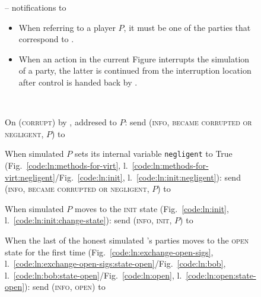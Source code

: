 \begin{figure}[H]
  \begin{simulatorbox}{\simulator{} -- notifications to \fchan}
    \begin{itemize}
      \item When referring to a player $P$, it must be one of the parties that
      correspond to \fchan.
      \item When an action in the current Figure interrupts the simulation of a
      party, the latter is continued from the interruption location after
      control is handed back by \fchan.
    \end{itemize} \ \\
    \begin{algorithmic}[1]
      \State On (\textsc{corrupt}) by \adversary, addresed to $P$:
      \Indent
        \State {}
        \State send (\textsc{info}, \textsc{became corrupted or negligent}, $P$)
        to \fchan
      \EndIndent
      \Statex

      \State When simulated $P$ sets its internal variable \texttt{negligent} to
      True (Fig.~\ref{code:ln:methods-for-virt},
      l.~\ref{code:ln:methods-for-virt:negligent}/Fig.~\ref{code:ln:init},
      l.~\ref{code:ln:init:negligent}):
      \Indent
        \State send (\textsc{info}, \textsc{became corrupted or negligent}, $P$)
        to \fchan
      \EndIndent
      \Statex

      \State When simulated $P$ moves to the \textsc{init} state
      (Fig.~\ref{code:ln:init}, l.~\ref{code:ln:init:change-state}):
      \Indent
        \State send (\textsc{info}, \textsc{init}, $P$) to \fchan
      \EndIndent
      \Statex

      \State When the last of the honest simulated \fchan's parties moves to the
      \textsc{open} state for the first time
      (Fig.~\ref{code:ln:exchange-open-sigs},
      l.~\ref{code:ln:exchange-open-sigs:state-open}/Fig.~\ref{code:ln:bob},
      l.~\ref{code:ln:bob:state-open}/Fig.~\ref{code:ln:open},
      l.~\ref{code:ln:open:state-open}):
      \Indent
        \State send (\textsc{info}, \textsc{open}) to \fchan
      \EndIndent
      \Statex


\end{algorithmic}
\end{simulatorbox}
\end{figure}
